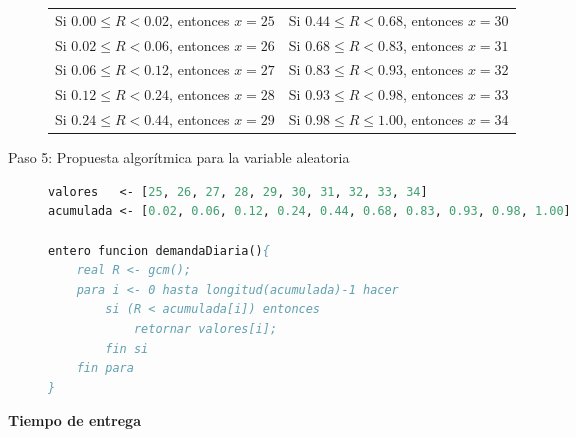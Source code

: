 \begin{description}
    \begin{center}
    \begin{tabular}{ll}
    Si $0.00 \leq R < 0.02$, entonces $x=25$ & Si $0.44 \leq R < 0.68$, entonces $x=30$ \\
    Si $0.02 \leq R < 0.06$, entonces $x=26$ & Si $0.68 \leq R < 0.83$, entonces $x=31$ \\
    Si $0.06 \leq R < 0.12$, entonces $x=27$ & Si $0.83 \leq R < 0.93$, entonces $x=32$ \\
    Si $0.12 \leq R < 0.24$, entonces $x=28$ & Si $0.93 \leq R < 0.98$, entonces $x=33$ \\
    Si $0.24 \leq R < 0.44$, entonces $x=29$ & Si $0.98 \leq R \leq 1.00$, entonces $x=34$ \\
    \end{tabular}
    \end{center}

    \item[Paso 5: Propuesta algorítmica para la variable aleatoria]

    \begin{lstlisting}[caption={demandaDiaria()}, language=Pascal]
valores   <- [25, 26, 27, 28, 29, 30, 31, 32, 33, 34]
acumulada <- [0.02, 0.06, 0.12, 0.24, 0.44, 0.68, 0.83, 0.93, 0.98, 1.00]

entero funcion demandaDiaria(){
    real R <- gcm();
    para i <- 0 hasta longitud(acumulada)-1 hacer
        si (R < acumulada[i]) entonces
            retornar valores[i];
        fin si
    fin para
}
    \end{lstlisting}
\end{description}

\textbf{Tiempo de entrega}

